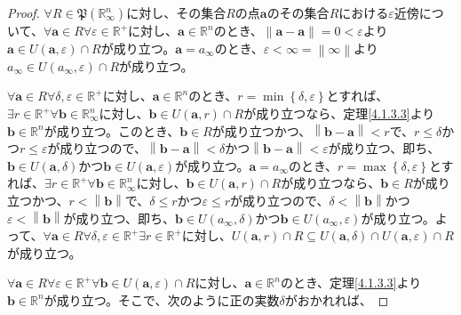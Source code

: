 \documentclass[dvipdfmx]{jsarticle}
\begin{document}
\begin{proof}
$\forall R \in \mathfrak{P}\left( \mathbb{R}_{\infty}^{n} \right)$に対し、その集合$R$の点$\mathbf{a}$のその集合$R$における$\varepsilon$近傍について、$\forall\mathbf{a} \in R\forall\varepsilon \in \mathbb{R}^{+}$に対し、$\mathbf{a} \in \mathbb{R}^{n}$のとき、$\left\| \mathbf{a} - \mathbf{a} \right\| = 0 < \varepsilon$より$\mathbf{a} \in U\left( \mathbf{a},\varepsilon \right) \cap R$が成り立つ。$\mathbf{a} = a_{\infty}$のとき、$\varepsilon < \infty = \left\| \infty \right\|$より$a_{\infty} \in U\left( a_{\infty},\varepsilon \right) \cap R$が成り立つ。\par
$\forall\mathbf{a} \in R\forall\delta,\varepsilon \in \mathbb{R}^{+}$に対し、$\mathbf{a} \in \mathbb{R}^{n}$のとき、$r = \min\left\{ \delta,\varepsilon \right\}$とすれば、$\exists r \in \mathbb{R}^{+}\forall\mathbf{b} \in \mathbb{R}_{\infty}^{n}$に対し、$\mathbf{b} \in U\left( \mathbf{a},r \right) \cap R$が成り立つなら、定理\ref{4.1.3.3}より$\mathbf{b} \in \mathbb{R}^{n}$が成り立つ。このとき、$\mathbf{b} \in R$が成り立つかつ、$\left\| \mathbf{b} - \mathbf{a} \right\| < r$で、$r \leq \delta$かつ$r \leq \varepsilon$が成り立つので、$\left\| \mathbf{b} - \mathbf{a} \right\| < \delta$かつ$\left\| \mathbf{b} - \mathbf{a} \right\| < \varepsilon$が成り立つ、即ち、$\mathbf{b} \in U\left( \mathbf{a},\delta \right)$かつ$\mathbf{b} \in U\left( \mathbf{a},\varepsilon \right)$が成り立つ。$\mathbf{a} = a_{\infty}$のとき、$r = \max\left\{ \delta,\varepsilon \right\}$とすれば、$\exists r \in \mathbb{R}^{+}\forall\mathbf{b} \in \mathbb{R}_{\infty}^{n}$に対し、$\mathbf{b} \in U\left( \mathbf{a},r \right) \cap R$が成り立つなら、$\mathbf{b} \in R$が成り立つかつ、$r < \left\| \mathbf{b} \right\|$で、$\delta \leq r$かつ$\varepsilon \leq r$が成り立つので、$\delta < \left\| \mathbf{b} \right\|$かつ$\varepsilon < \left\| \mathbf{b} \right\|$が成り立つ、即ち、$\mathbf{b} \in U\left( a_{\infty},\delta \right)$かつ$\mathbf{b} \in U\left( a_{\infty},\varepsilon \right)$が成り立つ。よって、$\forall\mathbf{a} \in R\forall\delta,\varepsilon \in \mathbb{R}^{+}\exists r \in \mathbb{R}^{+}$に対し、$U\left( \mathbf{a},r \right) \cap R \subseteq U\left( \mathbf{a},\delta \right) \cap U\left( \mathbf{a},\varepsilon \right) \cap R$が成り立つ。\par
$\forall\mathbf{a} \in R\forall\varepsilon \in \mathbb{R}^{+}\forall\mathbf{b} \in U\left( \mathbf{a},\varepsilon \right) \cap R$に対し、$\mathbf{a} \in \mathbb{R}^{n}$のとき、定理\ref{4.1.3.3}より$\mathbf{b} \in \mathbb{R}^{n}$が成り立つ。そこで、次のように正の実数$\delta$がおかれれば、

\end{proof}
\end{document}
